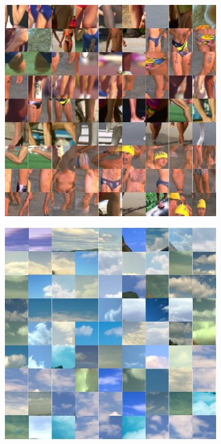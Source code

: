 \begin{figure}[!ht]
\begin{subfigure}[b]{.32\textwidth}
        \includegraphics[width=\linewidth]{figures/tsne_b.pdf}
        \caption{}
    \end{subfigure}
    \begin{subfigure}[b]{.32\textwidth}
        \centering
        \includegraphics[width=\linewidth]{figures/tsne_c.pdf}

\end{subfigure}
\end{figure}
